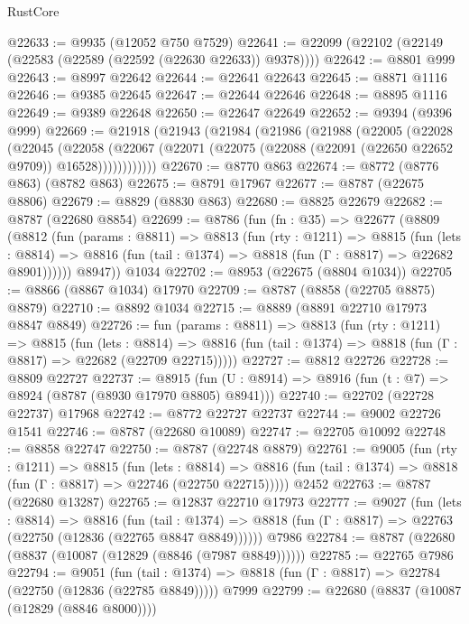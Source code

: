 \begin{lexlean}{RustCore}
\begin{coremodule}
@22633 := @9935 (@12052 @750 @7529)
@22641 := @22099 (@22102 (@22149 (@22583 (@22589 (@22592 (@22630 @22633)) @9378))))
@22642 := @8801 @999
@22643 := @8997 @22642
@22644 := @22641 @22643
@22645 := @8871 @1116
@22646 := @9385 @22645
@22647 := @22644 @22646
@22648 := @8895 @1116
@22649 := @9389 @22648
@22650 := @22647 @22649
@22652 := @9394 (@9396 @999)
@22669 := @21918
    (@21943
      (@21984
        (@21986
          (@21988
            (@22005
              (@22028
                (@22045
                  (@22058
                    (@22067
                      (@22071 (@22075 (@22088 (@22091 (@22650 @22652 @9709)) @16528))))))))))))
@22670 := @8770 @863
@22674 := @8772 (@8776 @863) (@8782 @863)
@22675 := @8791 @17967
@22677 := @8787 (@22675 @8806)
@22679 := @8829 (@8830 @863)
@22680 := @8825 @22679
@22682 := @8787 (@22680 @8854)
@22699 := @8786
    (fun (fn : @35) =>
    @22677
      (@8809
        (@8812
          (fun (params : @8811) =>
          @8813
            (fun (rty : @1211) =>
            @8815
              (fun (lets : @8814) =>
              @8816 (fun (tail : @1374) => @8818 (fun (Γ : @8817) => @22682 @8901))))))
        @8947))
    @1034
@22702 := @8953 (@22675 (@8804 @1034))
@22705 := @8866 (@8867 @1034) @17970
@22709 := @8787 (@8858 (@22705 @8875) @8879)
@22710 := @8892 @1034
@22715 := @8889 (@8891 @22710 @17973 @8847 @8849)
@22726 := fun (params : @8811) =>
  @8813
    (fun (rty : @1211) =>
    @8815
      (fun (lets : @8814) =>
      @8816 (fun (tail : @1374) => @8818 (fun (Γ : @8817) => @22682 (@22709 @22715)))))
@22727 := @8812 @22726
@22728 := @8809 @22727
@22737 := @8915
    (fun (U : @8914) => @8916 (fun (t : @7) => @8924 (@8787 (@8930 @17970 @8805) @8941)))
@22740 := @22702 (@22728 @22737) @17968
@22742 := @8772 @22727 @22737
@22744 := @9002 @22726 @1541
@22746 := @8787 (@22680 @10089)
@22747 := @22705 @10092
@22748 := @8858 @22747
@22750 := @8787 (@22748 @8879)
@22761 := @9005
    (fun (rty : @1211) =>
    @8815
      (fun (lets : @8814) =>
      @8816 (fun (tail : @1374) => @8818 (fun (Γ : @8817) => @22746 (@22750 @22715)))))
    @2452
@22763 := @8787 (@22680 @13287)
@22765 := @12837 @22710 @17973
@22777 := @9027
    (fun (lets : @8814) =>
    @8816
      (fun (tail : @1374) =>
      @8818 (fun (Γ : @8817) => @22763 (@22750 (@12836 (@22765 @8847 @8849))))))
    @7986
@22784 := @8787 (@22680 (@8837 (@10087 (@12829 (@8846 (@7987 @8849))))))
@22785 := @22765 @7986
@22794 := @9051
    (fun (tail : @1374) => @8818 (fun (Γ : @8817) => @22784 (@22750 (@12836 (@22785 @8849)))))
    @7999
@22799 := @22680 (@8837 (@10087 (@12829 (@8846 @8000))))

\end{coremodule}
\end{lexlean}
